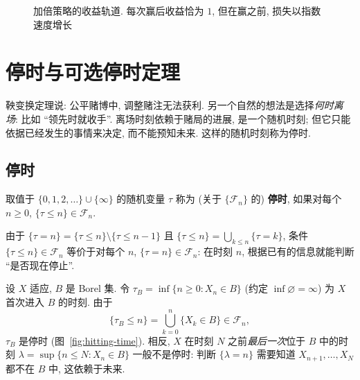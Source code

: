 \begin{figure}[htbp]
\centering
{}
\caption{加倍策略的收益轨道. 每次赢后收益恰为 $1$, 但在赢之前, 损失以指数速度增长}
\label{fig:doubling}
\end{figure}

\section{停时与可选停时定理}
\label{sec:3-2}

鞅变换定理说: 公平赌博中, 调整赌注无法获利. 另一个自然的想法是选择\emph{何时离场}: 比如 ``领先时就收手''. 离场时刻依赖于赌局的进展, 是一个随机时刻; 但它只能依据已经发生的事情来决定, 而不能预知未来. 这样的随机时刻称为停时.

\subsection{停时}

\begin{definition}[停时]\label{def:stopping-time}
取值于 $\{0,1,2,\dots\}\cup\{\infty\}$ 的随机变量 $\tau$ 称为 (关于 $\{\mathcal{F}_n\}$ 的) \textbf{停时}, 如果对每个 $n\ge0$, $\{\tau\le n\}\in\mathcal{F}_n$.
\end{definition}

由于 $\{\tau=n\}=\{\tau\le n\}\setminus\{\tau\le n-1\}$ 且 $\{\tau\le n\}=\bigcup_{k\le n}\{\tau=k\}$, 条件 $\{\tau\le n\}\in\mathcal{F}_n$ 等价于对每个 $n$, $\{\tau=n\}\in\mathcal{F}_n$: 在时刻 $n$, 根据已有的信息就能判断 ``是否现在停止''.

\begin{example}[首达时]\label{ex:hitting-time}
设 $X$ 适应, $B$ 是 Borel 集. 令 $\tau_B=\inf\{n\ge0: X_n\in B\}$ (约定 $\inf\varnothing=\infty$) 为 $X$ 首次进入 $B$ 的时刻. 由于
\[
\{\tau_B\le n\}=\bigcup_{k=0}^n\{X_k\in B\}\in\mathcal{F}_n,
\]
$\tau_B$ 是停时 (图~\ref{fig:hitting-time}). 相反, $X$ 在时刻 $N$ 之前\emph{最后一次}位于 $B$ 中的时刻 $\lambda=\sup\{n\le N: X_n\in B\}$ 一般不是停时: 判断 $\{\lambda=n\}$ 需要知道 $X_{n+1},\dots,X_N$ 都不在 $B$ 中, 这依赖于未来.
\end{example}

